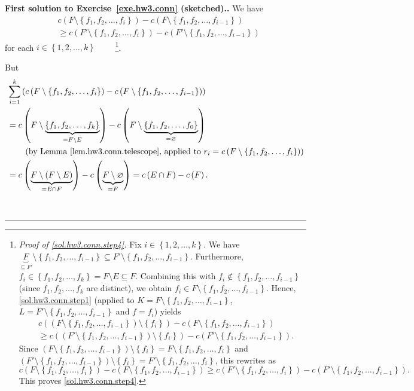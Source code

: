 \documentclass[numbers=enddot,12pt,final,onecolumn,notitlepage]{scrartcl}%
\theoremstyle{definition}
\newenvironment{proof}[1][Proof]{\noindent\textbf{#1.} }{\ \rule{0.5em}{0.5em}}
\let\sumnonlimits\sum
\renewcommand{\sum}{\sumnonlimits\limits}
\newcommand{\set}[1]{\left\{ #1 \right\}}
\newcommand{\tup}[1]{\left( #1 \right)}
\begin{document}
\begin{proof}[First solution to Exercise~\ref{exe.hw3.conn}
(sketched).]
We have
\begin{align}
& c \tup{F \setminus \set{f_1, f_2, \ldots, f_i}}
- c \tup{F \setminus \set{f_1, f_2, \ldots, f_{i-1}}}
\nonumber \\
&\geq
c \tup{F' \setminus \set{f_1, f_2, \ldots, f_i}}
- c \tup{F' \setminus \set{f_1, f_2, \ldots, f_{i-1}}}
\label{sol.hw3.conn.step4}
\end{align}
for each $i \in \set{1, 2, \ldots, k}$
\ \ \ \ \footnote{\textit{Proof of \eqref{sol.hw3.conn.step4}.}
  Fix $i \in \set{1, 2, \ldots, k}$.
  We have
  $\underbrace{F}_{\subseteq F'}
       \setminus \set{f_1, f_2, \ldots, f_{i-1}}
   \subseteq F' \setminus \set{f_1, f_2, \ldots, f_{i-1}}$.
  Furthermore, $f_i \in \set{f_1, f_2, \ldots, f_k}
  = F \setminus E \subseteq F$.
  Combining this with
  $f_i \notin \set{f_1, f_2, \ldots, f_{i-1}}$ (since
  $f_1, f_2, \ldots, f_k$ are distinct), we obtain
  $f_i \in F \setminus \set{f_1, f_2, \ldots, f_{i-1}}$.
  Hence, \eqref{sol.hw3.conn.step1} (applied to
  $K = F \setminus \set{f_1, f_2, \ldots, f_{i-1}}$,
  $L = F' \setminus \set{f_1, f_2, \ldots, f_{i-1}}$ and
  $f = f_i$)
  yields
  \begin{align*}
  & c\tup{\tup{F \setminus \set{f_1, f_2, \ldots, f_{i-1}}}
                \setminus \set{f_i}}
  - c \tup{F \setminus \set{f_1, f_2, \ldots, f_{i-1}}} \\
  & \geq
  c\tup{\tup{F' \setminus \set{f_1, f_2, \ldots, f_{i-1}}}
                \setminus \set{f_i}}
  - c \tup{F' \setminus \set{f_1, f_2, \ldots, f_{i-1}}} .
  \end{align*}
  Since
  $\tup{F \setminus \set{f_1, f_2, \ldots, f_{i-1}}}
    \setminus \set{f_i}
  = F \setminus \set{f_1, f_2, \ldots, f_i}$ and
  $\tup{F' \setminus \set{f_1, f_2, \ldots, f_{i-1}}}
    \setminus \set{f_i}
  = F' \setminus \set{f_1, f_2, \ldots, f_i}$,
  this rewrites as
  \[
  c \tup{F \setminus \set{f_1, f_2, \ldots, f_i}}
  - c \tup{F \setminus \set{f_1, f_2, \ldots, f_{i-1}}}
  \geq
  c \tup{F' \setminus \set{f_1, f_2, \ldots, f_i}}
  - c \tup{F' \setminus \set{f_1, f_2, \ldots, f_{i-1}}} .
  \]
  This proves \eqref{sol.hw3.conn.step4}.
}.

But
\begin{align}
& \sum_{i=1}^k
   \tup{c \tup{F \setminus \set{f_1, f_2, \ldots, f_i}}
        - c \tup{F \setminus \set{f_1, f_2, \ldots, f_{i-1}}}}
\nonumber \\
&= c \tup{F \setminus \underbrace{\set{f_1, f_2, \ldots, f_k}}_{= F \setminus E}} 
   - c \tup{F \setminus \underbrace{\set{f_1, f_2, \ldots, f_0}}_{= \varnothing}}
\nonumber \\
&\qquad
\left(\text{by Lemma~\ref{lem.hw3.conn.telescope}, applied to }
        r_i = c \tup{F \setminus \set{f_1, f_2, \ldots, f_i}}\right)
\nonumber \\
&= c \tup{\underbrace{F \setminus \tup{F \setminus E}}_{= E \cap F}}
   - c \tup{\underbrace{F \setminus \varnothing}_{= F}}
 = c \tup{E \cap F} - c \tup{F} .
\label{sol.hw3.conn.telescope1}
\end{align}


\end{proof}
\end{document}
